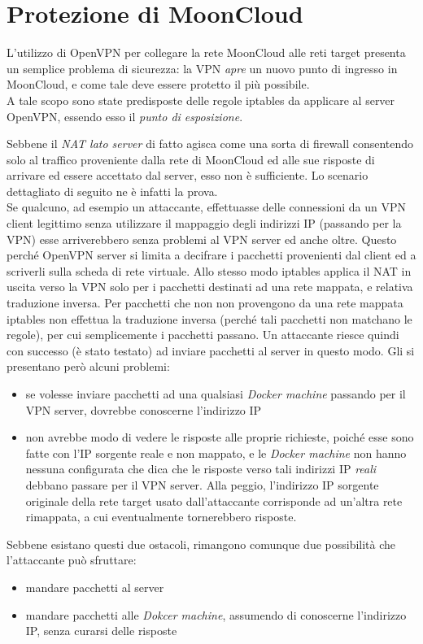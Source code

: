 \section{Protezione di MoonCloud}
L'utilizzo di OpenVPN per collegare la rete MoonCloud alle reti
target presenta un semplice problema di sicurezza: la VPN \textit{apre}
un nuovo punto di ingresso in MoonCloud, e come tale deve essere protetto
il più possibile.\\
A tale scopo sono state predisposte delle regole iptables da applicare
al server OpenVPN, essendo esso il \textit{punto di esposizione}.


Sebbene il \textit{NAT lato server} di fatto agisca come una sorta
di firewall consentendo solo al traffico proveniente dalla rete
di MoonCloud ed alle sue risposte di arrivare ed essere accettato
dal server, esso non è sufficiente. Lo scenario dettagliato di seguito
ne è infatti la prova.\\
Se qualcuno, ad esempio un attaccante,
effettuasse delle connessioni da un VPN client legittimo senza utilizzare il mappaggio
degli indirizzi IP (passando per la VPN) esse arriverebbero senza problemi
al VPN server ed anche oltre. Questo perché OpenVPN server si limita
a decifrare i pacchetti provenienti dal client ed a scriverli sulla scheda di rete
virtuale. Allo stesso modo iptables applica il NAT in uscita verso la VPN solo per
i pacchetti destinati ad una rete mappata, e relativa traduzione inversa. Per pacchetti
che non non provengono da una rete mappata iptables non effettua la traduzione
inversa (perché tali pacchetti non matchano le regole), per cui semplicemente
i pacchetti passano.
Un attaccante riesce quindi con successo (è stato testato) ad inviare pacchetti
al server in questo modo.
Gli si presentano però alcuni problemi:
\begin{itemize}
	\item se volesse inviare pacchetti ad una qualsiasi \textit{Docker machine}
	      passando per il VPN server, dovrebbe conoscerne l'indirizzo IP
	\item non avrebbe modo di vedere le risposte alle proprie richieste, poiché
	      esse sono fatte con l'IP sorgente reale e non mappato, e le \textit{Docker machine}
	      non hanno nessuna configurata che dica che le risposte verso tali indirizzi
	      IP \textit{reali} debbano passare per il VPN server. Alla peggio, l'indirizzo IP
	      sorgente originale della rete target usato dall'attaccante corrisponde
	      ad un'altra rete rimappata, a cui eventualmente tornerebbero risposte.
\end{itemize}
Sebbene esistano questi due ostacoli, rimangono comunque due possibilità che
l'attaccante può sfruttare:
\begin{itemize}
	\item mandare pacchetti al server
	\item mandare pacchetti alle \textit{Dokcer machine}, assumendo di conoscerne
	      l'indirizzo IP, senza curarsi delle risposte
\end{itemize}

